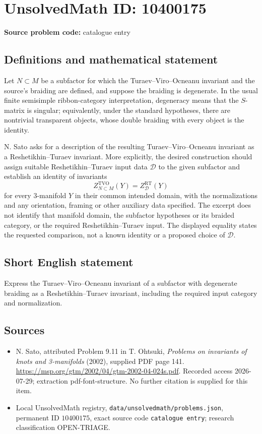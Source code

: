 \documentclass[11pt]{article}
\begin{document}
\section*{UnsolvedMath ID: 10400175}
\textbf{Source problem code:} catalogue entry
\subsection{Definitions and mathematical statement}
Let \(N\subset M\) be a subfactor for which the Turaev--Viro--Ocneanu invariant and the source's braiding are defined, and suppose the braiding is degenerate. In the usual finite semisimple ribbon-category interpretation, degeneracy means that the \(S\)-matrix is singular; equivalently, under the standard hypotheses, there are nontrivial transparent objects, whose double braiding with every object is the identity.

N. Sato asks for a description of the resulting Turaev--Viro--Ocneanu invariant as a Reshetikhin--Turaev invariant. More explicitly, the desired construction should assign suitable Reshetikhin--Turaev input data \(\mathcal D\) to the given subfactor and establish an identity of invariants
\[
 Z^{\mathrm{TVO}}_{N\subset M}(Y)=Z^{\mathrm{RT}}_{\mathcal D}(Y)
\]
for every \(3\)-manifold \(Y\) in their common intended domain, with the normalizations and any orientation, framing or other auxiliary data specified. The excerpt does not identify that manifold domain, the subfactor hypotheses or its braided category, or the required Reshetikhin--Turaev input. The displayed equality states the requested comparison, not a known identity or a proposed choice of \(\mathcal D\).
\subsection{Short English statement}
Express the Turaev--Viro--Ocneanu invariant of a subfactor with degenerate braiding as a Reshetikhin--Turaev invariant, including the required input category and normalization.
\subsection{Sources}
\begin{itemize}
\item N. Sato, attributed Problem 9.11 in T. Ohtsuki, \emph{Problems on invariants of knots and 3-manifolds} (2002), supplied PDF page 141. \url{https://msp.org/gtm/2002/04/gtm-2002-04-024s.pdf}. Recorded access 2026-07-29; extraction pdf-font-structure. No further citation is supplied for this item.
\item Local UnsolvedMath registry, \texttt{data/unsolvedmath/problems.json}, permanent ID \(10400175\), exact source code \texttt{catalogue entry}; research classification OPEN-TRIAGE.
\end{itemize}
\end{document}
